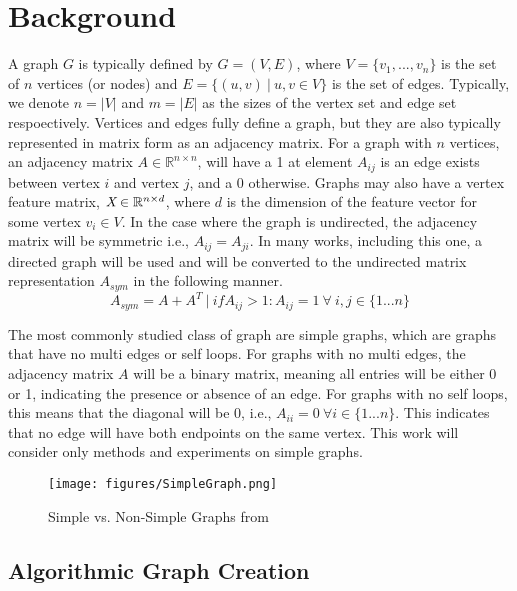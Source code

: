 \documentclass{article}
\begin{document}
\section{Background}
\label{background}

A graph $G$ is typically defined by $G = (V, E)$, where $V=\{v_1, ..., v_n\}$ is the set of $n$ vertices (or nodes) and $E=\{(u, v)\ |\ u, v \in V\}$ is the set of edges. Typically, we denote $n = |V|$ and $m = |E|$ as the sizes of the vertex set and edge set respoectively. Vertices and edges fully define a graph, but they are also typically represented in matrix form as an adjacency matrix. For a graph with $n$ vertices, an adjacency matrix $A \in\mathbb{R}^{n\times n}$, will have a 1 at element $A_{ij}$ is an edge exists between vertex $i$ and vertex $j$, and a 0 otherwise. Graphs may also have a vertex feature matrix, $\emph{X} \in \mathbb{R}^{n\times d}$, where $d$ is the dimension of the feature vector for some vertex $v_i \in V$. In the case where the graph is undirected, the adjacency matrix will be symmetric i.e., $A_{ij} = A_{ji}$. In many works, including this one, a directed graph will be used and will be converted to the undirected  matrix representation $A_{sym}$ in the following manner. 
\[
A_{sym} = A + A^T\ |\ if A_{ij} > 1: A_{ij} = 1\ \forall\ i,j \in \{1...n\}
\]

The most commonly studied class of graph are simple graphs, which are graphs that have no multi edges or self loops. For graphs with no multi edges, the adjacency matrix $A$ will be a binary matrix, meaning all entries will be either 0 or 1, indicating the presence or absence of an edge. For graphs with no self loops, this means that the diagonal will be 0, i.e., $A_{ii}=0\ \forall i \in \{1...n\}$. This indicates that no edge will have both endpoints on the same vertex. This work will consider only methods and experiments on simple graphs.

\begin{figure}[h]
\centering
\texttt{[image: figures/SimpleGraph.png]}
\caption{Simple vs. Non-Simple Graphs from \cite{simplegraphweisstein}}
\label{SimpleGraph}
\end{figure}

\subsection{Algorithmic Graph Creation}
\end{document}
